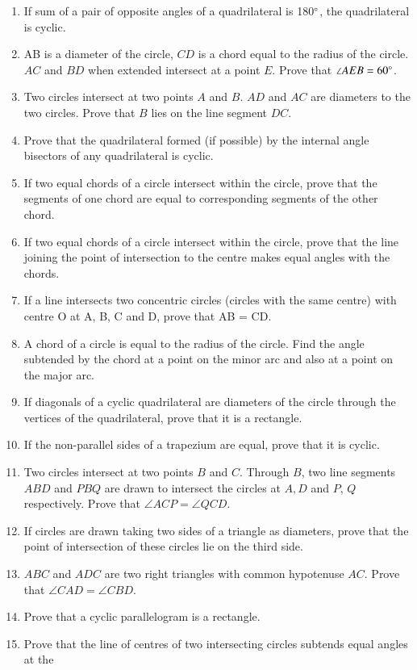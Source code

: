 \begin{enumerate}[label=\arabic*.,ref=\thesubsection.\theenumi]
\item  If sum of a pair of opposite angles of a quadrilateral is 180$\degree$, the quadrilateral is cyclic.
%
\item AB is a diameter of the circle, $CD$ is a chord equal to the radius of the circle. $AC$ and $BD$ when extended intersect at a point $E$. Prove that $\angle AEB = 60\degree$.
\item Two circles intersect at two points $A$ and $B$. $AD$ and $AC$ are diameters to the two circles. Prove that $B$ lies on the line segment $DC$.
\item Prove that the quadrilateral formed (if possible) by the internal angle bisectors of any quadrilateral is cyclic.
\item  If two equal chords of a circle intersect within the circle, prove that the segments of one chord are equal to corresponding segments of the other chord.
\item If two equal chords of a circle intersect within the circle, prove that the line joining the point of intersection to the centre makes equal angles with the chords.
\item If a line intersects two concentric circles (circles with the same centre) with centre O at A, B, C and D, prove that AB = CD.
\item A chord of a circle is equal to the radius of the
circle. Find the angle subtended by the chord at
a point on the minor arc and also at a point on the
major arc.
\item If diagonals of a cyclic quadrilateral are diameters of the circle through the vertices of
the quadrilateral, prove that it is a rectangle.
\item If the non-parallel sides of a trapezium are equal, prove that it is cyclic.
\item Two circles intersect at two points $B$ and $C$.
Through $B$, two line segments $ABD$ and $PBQ$
are drawn to intersect the circles at $A, D$ and $P$,
$Q$ respectively. Prove that
$\angle ACP = \angle QCD$.
\item If circles are drawn taking two sides of a triangle as diameters, prove that the point of
intersection of these circles lie on the third side.
\item $ABC$ and $ADC$ are two right triangles with common hypotenuse $AC$. Prove that
$\angle CAD = \angle CBD$.
\item Prove that a cyclic parallelogram is a rectangle.
\item Prove that the line of centres of two intersecting circles subtends equal angles at the

\end{enumerate}
